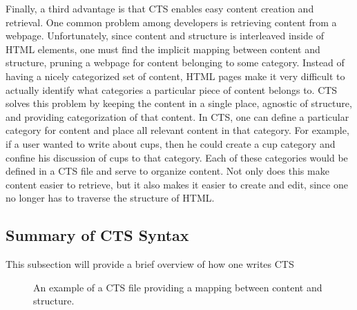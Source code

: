 \documentclass[12pt]{article}
\begin{document}
Finally, a third advantage is that CTS enables easy content creation and retrieval. One common problem among developers is retrieving content from a webpage. Unfortunately, since content and structure is interleaved inside of HTML elements, one must find the implicit mapping between content and structure, pruning a webpage for content belonging to some category. Instead of having a nicely categorized set of content, HTML pages make it very difficult to actually identify what categories a particular piece of content belongs to. CTS solves this problem by keeping the content in a single place, agnostic of structure, and providing categorization of that content. In CTS, one can define a particular category for content and place all relevant content in that category. For example, if a user wanted to write about cups, then he could create a cup category and confine his discussion of cups to that category. Each of these categories would be defined in a CTS file and serve to organize content. Not only does this make content easier to retrieve, but it also makes it easier to create and edit, since one no longer has to traverse the structure of HTML.

\subsection{Summary of CTS Syntax}

This subsection will provide a brief overview of how one writes CTS

\begin{figure}
  \caption{An example of a CTS file providing a mapping between content and structure.}
\end{figure}
\end{document}
